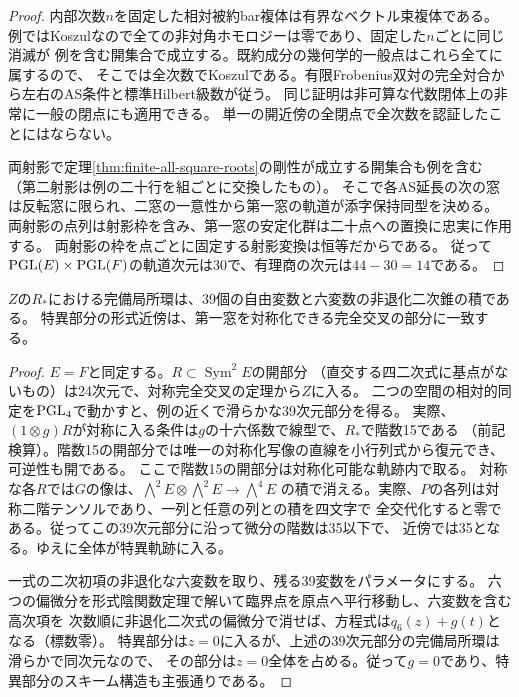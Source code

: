 \begin{proof}
内部次数$n$を固定した相対被約bar複体は有界なベクトル束複体である。
例ではKoszulなので全ての非対角ホモロジーは零であり、固定した$n$ごとに同じ消滅が
例を含む開集合で成立する。既約成分の幾何学的一般点はこれら全てに属するので、
そこでは全次数でKoszulである。有限Frobenius双対の完全対合から左右のAS条件と標準Hilbert級数が従う。
同じ証明は非可算な代数閉体上の非常に一般の閉点にも適用できる。
単一の開近傍の全閉点で全次数を認証したことにはならない。

両射影で定理\ref{thm:finite-all-square-roots}の剛性が成立する開集合も例を含む
（第二射影は例の二十行を組ごとに交換したもの）。
そこで各AS延長の次の窓は反転窓に限られ、二窓の一意性から第一窓の軌道が添字保持同型を決める。
両射影の点列は射影枠を含み、第一窓の安定化群は二十点への置換に忠実に作用する。
両射影の枠を点ごとに固定する射影変換は恒等だからである。
従って$\operatorname{PGL}(E)\times\operatorname{PGL}(F)$の軌道次元は30で、有理商の次元は$44-30=14$である。
\end{proof}

\begin{corollary}[対称部分に横断的な二次錐]\label{cor:reversible-quadratic-cone}
$Z$の$R_*$における完備局所環は、39個の自由変数と六変数の非退化二次錐の積である。
特異部分の形式近傍は、第一窓を対称化できる完全交叉の部分に一致する。
\end{corollary}
\begin{proof}
$E=F$と同定する。$R\subset\operatorname{Sym}^2 E$の開部分
（直交する四二次式に基点がないもの）は24次元で、対称完全交叉の定理から$Z$に入る。
二つの空間の相対的同定を$\operatorname{PGL}_4$で動かすと、例の近くで滑らかな39次元部分を得る。
実際、$(1\otimes g)R$が対称に入る条件は$g$の十六係数で線型で、$R_*$で階数15である
（前記検算）。階数15の開部分では唯一の対称化写像の直線を小行列式から復元でき、可逆性も開である。
ここで階数15の開部分は対称化可能な軌跡内で取る。
対称な各$R$では$G$の像は、$\bigwedge^2 E\otimes\bigwedge^2 E\to\bigwedge^4 E$
の積で消える。実際、$P$の各列は対称二階テンソルであり、一列と任意の列との積を四文字で
全交代化すると零である。従ってこの39次元部分に沿って微分の階数は35以下で、
近傍では35となる。ゆえに全体が特異軌跡に入る。

一式の二次初項の非退化な六変数を取り、残る39変数をパラメータにする。
六つの偏微分を形式陰関数定理で解いて臨界点を原点へ平行移動し、六変数を含む高次項を
次数順に非退化二次式の偏微分で消せば、方程式は$q_6(z)+g(t)$となる（標数零）。
特異部分は$z=0$に入るが、上述の39次元部分の完備局所環は滑らかで同次元なので、
その部分は$z=0$全体を占める。従って$g=0$であり、特異部分のスキーム構造も主張通りである。
\end{proof}

